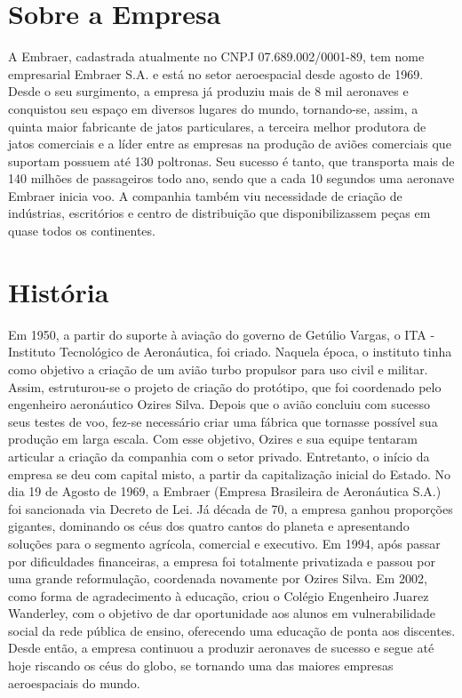 \documentclass[
    12pt,               %
    openright,          %
    oneside,
    a4paper,            %
    draft,              %
    MODELO,             %
    TODO,               %
    english,            %
    brazil              %
    ]{ifsp-spo-inf-ctds}
\begin{document}
\frenchspacing 

\pretextual

\imprimirfolhaderosto

\textual
\section{Sobre a Empresa}
A Embraer, cadastrada atualmente no CNPJ 07.689.002/0001-89, tem nome empresarial Embraer S.A. e está no setor aeroespacial desde agosto de 1969. Desde o seu surgimento, a empresa já produziu mais de 8 mil aeronaves e conquistou seu espaço em diversos lugares do mundo, tornando-se, assim, a quinta maior fabricante de jatos particulares, a terceira melhor produtora de jatos comerciais e a líder entre as empresas na produção de aviões comerciais que suportam possuem até 130 poltronas. Seu sucesso é tanto, que transporta mais de 140 milhões de passageiros todo ano, sendo que a cada 10 segundos uma aeronave Embraer inicia voo. A companhia também viu necessidade de criação de indústrias, escritórios e centro de distribuição que disponibilizassem peças em quase todos os continentes.

\section{História}
Em 1950, a partir do suporte à aviação do governo de Getúlio Vargas, o ITA - Instituto Tecnológico de Aeronáutica, foi criado. Naquela época, o instituto tinha como objetivo a criação de um avião turbo propulsor para uso civil e militar. Assim, estruturou-se o projeto de criação do protótipo, que foi coordenado pelo engenheiro aeronáutico Ozires Silva. Depois que o avião concluiu com sucesso seus testes de voo, fez-se necessário criar uma fábrica que tornasse possível sua produção em larga escala. 
	Com esse objetivo, Ozires e sua equipe tentaram articular a criação da companhia com o  setor privado. Entretanto, o início da empresa se deu com capital misto, a partir da capitalização inicial do Estado. No dia 19 de Agosto de 1969, a Embraer (Empresa Brasileira de Aeronáutica S.A.) foi sancionada via Decreto de Lei. Já década de 70, a empresa ganhou proporções gigantes, dominando os céus dos quatro cantos do planeta e apresentando soluções para o segmento agrícola, comercial e executivo.
	Em 1994, após passar por dificuldades financeiras, a empresa foi totalmente privatizada e passou por uma grande reformulação, coordenada novamente por Ozires Silva. Em 2002, como forma de agradecimento à educação, criou o Colégio Engenheiro Juarez Wanderley, com o objetivo de dar oportunidade aos alunos em vulnerabilidade social da rede pública de ensino, oferecendo uma educação de ponta aos discentes. Desde então, a empresa continuou a produzir aeronaves de sucesso e segue até hoje riscando os céus do globo, se tornando uma das maiores empresas aeroespaciais do mundo.
	
\end{document}
